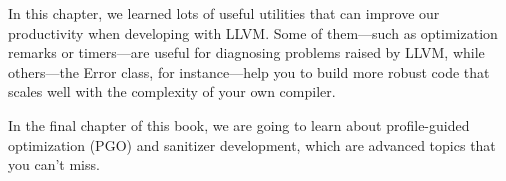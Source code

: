 In this chapter, we learned lots of useful utilities that can improve our productivity when developing with LLVM. Some of them—such as optimization remarks or timers—are useful for diagnosing problems raised by LLVM, while others—the Error class, for instance—help you to build more robust code that scales well with the complexity of your own compiler.

In the final chapter of this book, we are going to learn about profile-guided optimization (PGO) and sanitizer development, which are advanced topics that you can't miss.